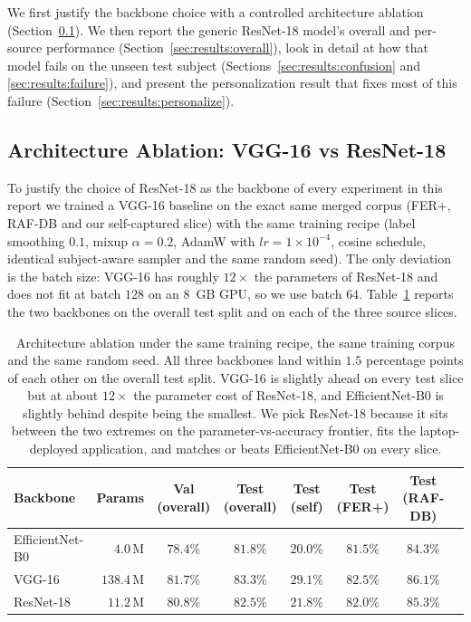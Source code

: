 \documentclass[12pt,a4paper]{article}
\begin{document}
We first justify the backbone choice with a controlled
architecture ablation (Section~\ref{sec:results:archabl}). We
then report the generic ResNet-18 model's overall and
per-source performance (Section~\ref{sec:results:overall}),
look in detail at how that model fails on the unseen test
subject (Sections~\ref{sec:results:confusion} and
\ref{sec:results:failure}), and present the personalization
result that fixes most of this failure
(Section~\ref{sec:results:personalize}).

\subsection{Architecture Ablation: VGG-16 vs ResNet-18}
\label{sec:results:archabl}

To justify the choice of ResNet-18 as the backbone of every
experiment in this report we trained a VGG-16 baseline
\autocite{simonyan2015vgg} on the exact same merged corpus
(FER+, RAF-DB and our self-captured slice) with the same
training recipe (label smoothing $0.1$, mixup $\alpha=0.2$,
AdamW with $lr=1\times 10^{-4}$, cosine schedule, identical
subject-aware sampler and the same random seed). The only
deviation is the batch size: VGG-16 has roughly $12\times$
the parameters of ResNet-18 and does not fit at batch $128$
on an $8$~GB GPU, so we use batch $64$.
Table~\ref{tab:archabl} reports the two backbones on the
overall test split and on each of the three source slices.

\begin{table}[H]
  \centering
  \footnotesize
  \begin{tabular}{lrcccccc}
    \toprule
    Backbone   & Params         & Val (overall) & Test (overall) & Test (self) & Test (FER+) & Test (RAF-DB) \\
    \midrule
    EfficientNet-B0 & $4.0$\,M & $78.4\%$ & $81.8\%$ & $20.0\%$ & $81.5\%$ & $84.3\%$ \\
    VGG-16     & $138.4$\,M         & $81.7\%$ & $83.3\%$ & $29.1\%$ & $82.5\%$ & $86.1\%$ \\
    ResNet-18  & $\mathbf{11.2}$\,M & $80.8\%$ & $82.5\%$ & $21.8\%$ & $82.0\%$ & $85.3\%$ \\
    \bottomrule
  \end{tabular}
  \caption{Architecture ablation under the same training
  recipe, the same training corpus and the same random seed.
  All three backbones land within $1.5$ percentage points of
  each other on the overall test split. VGG-16 is slightly
  ahead on every test slice but at about $12\times$ the
  parameter cost of ResNet-18, and EfficientNet-B0 is slightly
  behind despite being the smallest. We pick ResNet-18 because
  it sits between the two extremes on the parameter-vs-accuracy
  frontier, fits the laptop-deployed application, and matches
  or beats EfficientNet-B0 on every slice.}
  \label{tab:archabl}
\end{table}
\end{document}
